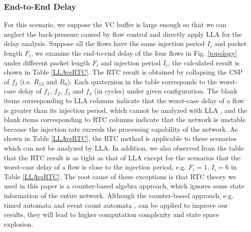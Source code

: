 \documentclass[10pt,journal]{IEEEtran}
\begin{document}
\subsubsection{End-to-End Delay}
For this scenario, we suppose the VC buffer is large enough so that we can neglect the back-pressure caused by flow control and directly apply LLA for the delay analysis. Suppose all the flows have the same injection period $I_i$ and packet length $F_i$, we examine the end-to-end delay of the four flows in Fig. \ref{topology} under different packet length $F_i$ and injection period $I_i$, the calculated result is shown in Table \ref{LLAvsRTC}. The RTC result is obtained by collapsing the CSP of $f_2$ (i.e. $R_{13}$ and $R_{9}$). Each quaternion in the table corresponds to the worst-case delay of $f_1$, $f_2$, $f_3$ and $f_4$ (in cycles) under given configuration. The blank items corresponding to LLA columns indicate that the worst-case delay of a flow is greater than its injection period, which cannot be analyzed with LLA \cite{73}\cite{189}, and the blank items corresponding to RTC columns indicate that the network is unstable because the injection rate exceeds the processing capability of the network. As shown in Table \ref{LLAvsRTC}, the RTC method is applicable to these scenarios which can not be analyzed by LLA. In addition, we also observed from the table that the RTC result is as tight as that of LLA except for the scenarios that the worst-case delay of a flow is close to the injection period, e.g. $F_i=1$, $I_i=6$ in Table \ref{LLAvsRTC}. The root cause of these exceptions is that RTC theory we used in this paper is a counter-based algebra approach, which ignores some state information of the entire network. Although the counter-based approach, e.g. timed automata \cite{Fersman2006301} and event count automata \cite{Chakraborty:2005:ECA:1106608.1106642}, can be applied to improve our results, they will lead to higher computation complexity and state space explosion.
\end{document}
